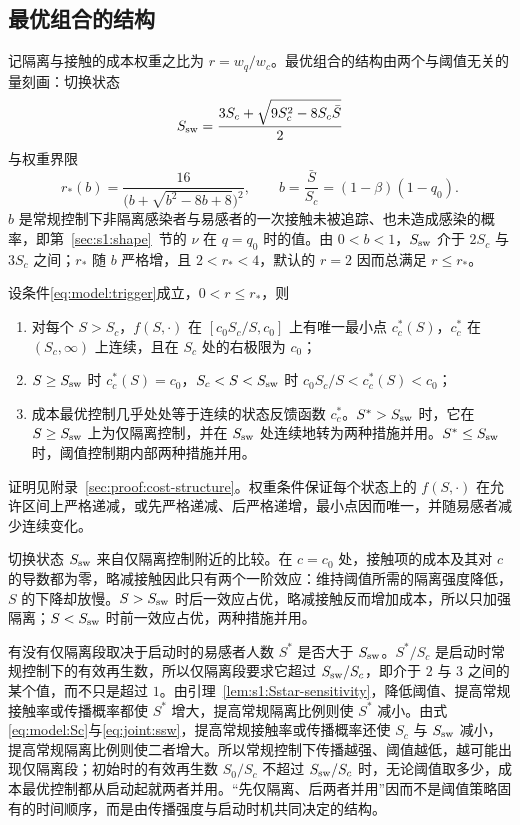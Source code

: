 \subsection{最优组合的结构}
\label{sec:joint:cost-structure}
记隔离与接触的成本权重之比为 $r=w_q/w_c$。最优组合的结构由两个与阈值无关的量刻画：切换状态
\begin{equation}
S_{\rm sw}=\frac{3S_c+\sqrt{9S_c^2-8S_c\bar S}}{2}
\label{eq:joint:ssw}
\end{equation}
与权重界限
\begin{equation}
r_*(b)=\frac{16}{\bigl(b+\sqrt{b^2-8b+8}\bigr)^2},\qquad
b=\frac{\bar S}{S_c}=(1-\beta)(1-q_0).
\label{eq:joint:rcont}
\end{equation}
$b$ 是常规控制下非隔离感染者与易感者的一次接触未被追踪、也未造成感染的概率，即第~\ref{sec:s1:shape}~节的 $\nu$ 在 $q=q_0$ 时的值。由 $0<b<1$，$S_{\rm sw}$ 介于 $2S_c$ 与 $3S_c$ 之间；$r_*$ 随 $b$ 严格增，且 $2<r_*<4$，默认的 $r=2$ 因而总满足 $r\le r_*$。
\begin{theorem}
\label{thm:joint:cost-structure}
设条件\eqref{eq:model:trigger}成立，$0<r\le r_*$，则
\begin{enumerate}
\renewcommand{\labelenumi}{(\roman{enumi})}
\item 对每个 $S>S_c$，$f(S,\cdot)$ 在 $[c_0S_c/S,c_0]$ 上有唯一最小点 $c_c^*(S)$，$c_c^*$ 在 $(S_c,\infty)$ 上连续，且在 $S_c$ 处的右极限为 $c_0$；
\item $S\ge S_{\rm sw}$ 时 $c_c^*(S)=c_0$，$S_c<S<S_{\rm sw}$ 时 $c_0S_c/S<c_c^*(S)<c_0$；
\item 成本最优控制几乎处处等于连续的状态反馈函数 $c_c^*$。$S^*>S_{\rm sw}$ 时，它在 $S\ge S_{\rm sw}$ 上为仅隔离控制，并在 $S_{\rm sw}$ 处连续地转为两种措施并用。$S^*\le S_{\rm sw}$ 时，阈值控制期内部两种措施并用。
\end{enumerate}
\end{theorem}
证明见附录~\ref{sec:proof:cost-structure}。权重条件保证每个状态上的 $f(S,\cdot)$ 在允许区间上严格递减，或先严格递减、后严格递增，最小点因而唯一，并随易感者减少连续变化。

切换状态 $S_{\rm sw}$ 来自仅隔离控制附近的比较。在 $c=c_0$ 处，接触项的成本及其对 $c$ 的导数都为零，略减接触因此只有两个一阶效应：维持阈值所需的隔离强度降低，$S$ 的下降却放慢。$S>S_{\rm sw}$ 时后一效应占优，略减接触反而增加成本，所以只加强隔离；$S<S_{\rm sw}$ 时前一效应占优，两种措施并用。

有没有仅隔离段取决于启动时的易感者人数 $S^*$ 是否大于 $S_{\rm sw}$。$S^*/S_c$ 是启动时常规控制下的有效再生数，所以仅隔离段要求它超过 $S_{\rm sw}/S_c$，即介于 $2$ 与 $3$ 之间的某个值，而不只是超过 $1$。由引理~\ref{lem:s1:Sstar-sensitivity}，降低阈值、提高常规接触率或传播概率都使 $S^*$ 增大，提高常规隔离比例则使 $S^*$ 减小。由式\eqref{eq:model:Sc}与\eqref{eq:joint:ssw}，提高常规接触率或传播概率还使 $S_c$ 与 $S_{\rm sw}$ 减小，提高常规隔离比例则使二者增大。所以常规控制下传播越强、阈值越低，越可能出现仅隔离段；初始时的有效再生数 $S_0/S_c$ 不超过 $S_{\rm sw}/S_c$ 时，无论阈值取多少，成本最优控制都从启动起就两者并用。“先仅隔离、后两者并用”因而不是阈值策略固有的时间顺序，而是由传播强度与启动时机共同决定的结构。

